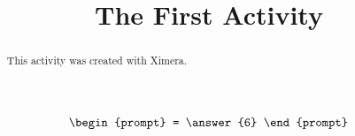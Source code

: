\documentclass{ximera}
\title{The First Activity}
\begin{document}
  
\begin{abstract}  
This activity was created with Ximera.
\end{abstract}  
\maketitle

\begin{problem}  
  \[
  \begin{prompt}
    = \answer{6}
  \end{prompt} 
    \] 
\end{problem}
\end{document}
